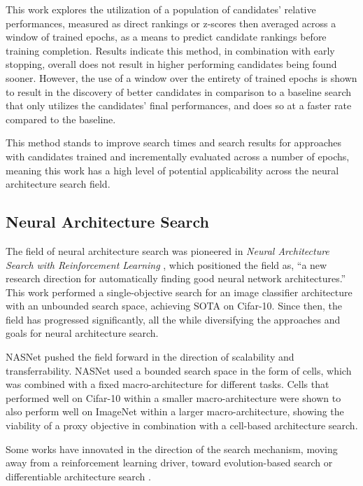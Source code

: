 \documentclass[twocolumn]{article}
\begin{document}
This work explores the utilization of a population of candidates' relative performances, 
measured as direct rankings or z-scores then averaged across a window of trained epochs,
as a means to predict candidate rankings before training completion. 
Results indicate this method, in combination with early stopping, overall does not result in higher performing candidates being found sooner.
However, the use of a window over the entirety of trained epochs is shown to result in 
the discovery of better candidates in comparison to a baseline search that only utilizes the candidates' final performances, 
and does so at a faster rate compared to the baseline.

This method stands to improve search times and search results for approaches with candidates trained and incrementally evaluated across a number of epochs,
meaning this work has a high level of potential applicability across the neural architecture search field.

\subsection {Neural Architecture Search}

The field of neural architecture search was pioneered in \emph{Neural Architecture Search with Reinforcement Learning} \cite{rl_nas}, which
positioned the field as, ``a new research direction for automatically finding good neural network architectures.''
This work performed a single-objective search for an image classifier architecture with an unbounded search space, achieving SOTA on Cifar-10.
Since then, the field has progressed significantly, all the while diversifying the approaches and goals for neural architecture search.

NASNet \cite{nasnet} pushed the field forward in the direction of scalability and transferrability.
NASNet used a bounded search space in the form of cells, which was combined with a fixed macro-architecture for different tasks.
Cells that performed well on Cifar-10 within a smaller macro-architecture were shown to also perform well on ImageNet within a larger macro-architecture,
showing the viability of a proxy objective in combination with a cell-based architecture search.

Some works have innovated in the direction of the search mechanism, moving away from a reinforcement learning driver, toward evolution-based search\cite{amoebanet}
or differentiable architecture search \cite{darts}.
\end{document}
